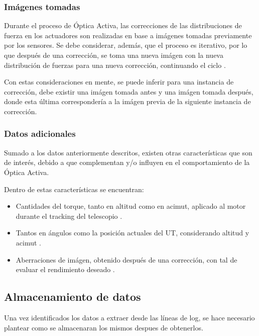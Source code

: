 \subsubsection{Imágenes tomadas}

Durante el proceso de Óptica Activa, las correcciones de las distribuciones de fuerza en los actuadores son realizadas en base a imágenes tomadas previamente por los sensores. Se debe considerar, además, que el proceso es iterativo, por lo que después de una corrección, se toma una nueva imágen con la nueva distribución de fuerzas para una nueva corrección, continuando el ciclo \cite{eso1998vlt}.

Con estas consideraciones en mente, se puede inferir para una instancia de corrección, debe existir una imágen tomada antes y una imágen tomada después, donde esta última correspondería a la imágen previa de la siguiente instancia de corrección.

\subsubsection{Datos adicionales}

Sumado a los datos anteriormente descritos, existen otras características que son de interés, debido a que complementan y/o influyen en el comportamiento de la Óptica Activa.

Dentro de estas características se encuentran:

\begin{itemize}
    \item Cantidades del torque, tanto en altitud como en acimut, aplicado al motor durante el tracking del telescopio \cite{eso1998vlt}.

    \item Tantos en ángulos como la posición actuales del UT, considerando altitud y acimut \cite{eso1998vlt}.

    \item Aberraciones de imágen, obtenido después de una corrección, con tal de evaluar el rendimiento deseado \cite{wilson1987active}.
    
\end{itemize}

\subsection{Almacenamiento de datos}

Una vez identificados los datos a extraer desde las líneas de log, se hace necesario plantear como se almacenaran los mismos despues de obtenerlos. 

